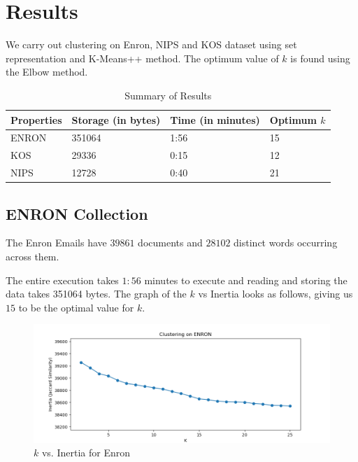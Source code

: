 \documentclass[10pt]{article}
\begin{document}
\section{Results}
    We carry out clustering on Enron, NIPS and KOS dataset using  set representation and K-Means++ method. The optimum value of $k$ is found using the Elbow method.
    \begin{table}[h]
        \begin{center}
            \begin{tabular}{|l|l|l|l|}
                \hline
                Properties &Storage (in bytes) &Time (in minutes) &Optimum $k$\\
                \hline
                ENRON &351064 &1:56 &15 \\
                KOS &29336 &0:15 &12 \\
                NIPS &12728 &0:40 &21 \\
                \hline
            \end{tabular}
        \end{center}
        \caption{Summary of Results}
    \end{table}

    \subsection{ENRON Collection}
        The Enron Emails have $39861$ documents and $28102$ distinct words occurring across them.

        The entire execution takes $1:56$ minutes to execute and reading and storing the data takes 351064 bytes.
        The graph of the $k$ vs Inertia looks as follows, giving us $15$ to be the optimal value for $k$.
        \begin{figure}[h]
            \centering
            \includegraphics[width=12cm]{ENRON.png}
            \caption{$k$ vs. Inertia for Enron}
            \label{fig:ENRON-Inertia}
        \end{figure}
\end{document}
